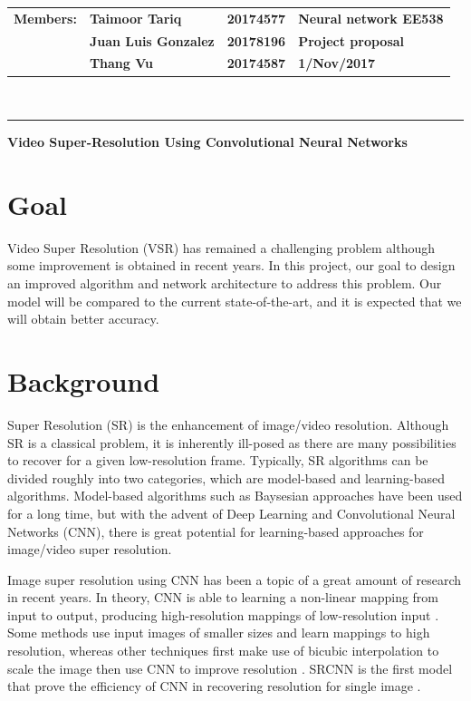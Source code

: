 \documentclass[10pt]{article}
\begin{document}
\noindent
\begin{tabular}{lll R{8.0cm}}
\textbf{Members:} & \textbf{Taimoor Tariq}      & \textbf{20174577} & \textbf{Neural network EE538}\\
\textbf{}         & \textbf{Juan Luis Gonzalez} & \textbf{20178196} & \textbf{Project proposal}\\
\textbf{}         & \textbf{Thang Vu}           & \textbf{20174587} & \textbf{1/Nov/2017}
\end{tabular}\\
\rule[2ex]{\textwidth}{2pt}

{\Large\centerline{\textbf{Video Super-Resolution Using Convolutional Neural Networks}}}

\section{Goal} %
\label{sec:goal}
Video Super Resolution (VSR) has remained a challenging problem although some improvement is obtained in recent years. In this project, our goal to design an improved algorithm and network architecture to address this problem. Our model will be compared to the current state-of-the-art, and it is expected that we will obtain better accuracy. 

\section{Background} %
\label{sec:background}
Super Resolution (SR) is the enhancement of image/video resolution. Although SR is a classical problem, it is inherently ill-posed as there are many possibilities to recover for a given low-resolution frame. Typically, SR algorithms can be divided roughly into two categories, which are model-based and learning-based algorithms. Model-based algorithms such as Baysesian approaches have been used for a long time, but with the advent of Deep Learning and Convolutional Neural Networks (CNN), there is great potential for learning-based approaches for image/video super resolution.

Image super resolution using CNN has been a topic of a great amount of research in recent years. In theory, CNN is able to learning a non-linear mapping from input to output, producing high-resolution mappings of low-resolution input \cite{dong2016image}. Some methods use input images of smaller sizes and learn mappings to high resolution, whereas other techniques first make use of bicubic interpolation to scale the image then use CNN to improve resolution \cite{dong2016image}. SRCNN is the first model that prove the efficiency of CNN in recovering resolution for single image \cite{dong2016image}. 
\end{document}
